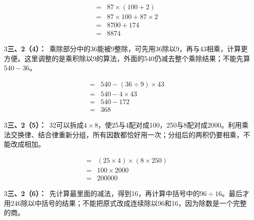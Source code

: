 \documentclass[multi=snippet,border={5bp 20bp 5bp 5bp}]{standalone}
\newenvironment{snippet}[3]{\begin{minipage}{#1bp}\color{answerred}\fontsize{#2}{#3}\selectfont\raggedright}{\end{minipage}}
\begin{document}
\begin{snippet}{143.233}{10.5}{12.8}\SourceSans\setlength{\mathindent}{2bp}\[\begin{aligned}={}&87\times(100+2)\\={}&87\times100+87\times2\\={}&8700+174\\={}&8874\end{aligned}\]\end{snippet}
\begin{snippet}{505}{11.5}{14}\begin{multicols}{3}\raggedcolumns \textbf{三、2（4）：}\ 乘除部分中的36能被9整除，可先用36除以9，再与43相乘，计算更方便。这里调整的是乘积除以9的算法，外面的540仍减去整个乘除结果；不能先算\(540-36\)\allowbreak 。\end{multicols}\end{snippet}
\begin{snippet}{152.733}{10.5}{12.8}\SourceSans\setlength{\mathindent}{2bp}\[\begin{aligned}={}&540-(36\div9)\times43\\={}&540-4\times43\\={}&540-172\\={}&368\end{aligned}\]\end{snippet}
\begin{snippet}{505}{11.5}{14}\begin{multicols}{3}\raggedcolumns \textbf{三、2（5）：}\ 32可以拆成\(4\times8\)\allowbreak ，使25与4配对成100，250与8配对成2000。利用乘法交换律、结合律重新分组，所有因数都恰好用一次；分组后的两积仍要相乘，不能改成相加。\end{multicols}\end{snippet}
\begin{snippet}{141.4}{10.5}{12.8}\SourceSans\setlength{\mathindent}{2bp}\[\begin{aligned}={}&(25\times4)\times(8\times250)\\={}&100\times2000\\={}&200000\end{aligned}\]\end{snippet}
\begin{snippet}{505}{11.5}{14}\begin{multicols}{3}\raggedcolumns \textbf{三、2（6）：}\ 先计算最里面的减法，得到16，再计算中括号中的\(96\div16\)\allowbreak 。最后才用246除以中括号的结果；不能把原式改成连续除以96和16，因为除数是一个完整的商。\end{multicols}\end{snippet}
\end{document}
